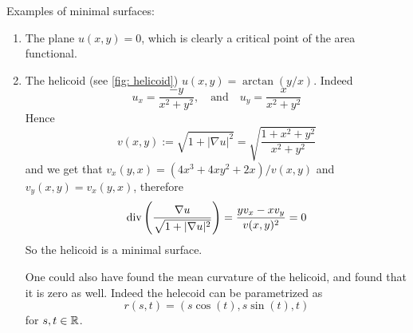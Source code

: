 \begin{example}
Examples of minimal surfaces:
\begin{enumerate}
\item The plane $u(x,y)=0$, which is clearly a critical point of the area functional.
\item The helicoid (see \cref{fig: helicoid}) $u(x,y)=\arctan(y/x)$. Indeed
\[
    u_x = \frac{-y}{x^2+y^2}, \quad \text{and} \quad u_y=\frac{x}{x^2+y^2}
\]
Hence
\[
    v(x,y):=\sqrt{1+|\nabla u|^2} = \sqrt{\frac{1+x^2+y^2}{x^2+y^2}}
\]
and we get that $v_x(y,x)=(4x^3+4xy^2+2x)/v(x,y)$ and $v_y(x,y)=v_x(y,x)$, therefore
\[
    \operatorname{div}\left(\frac{\nabla u}{\sqrt{1+|\nabla u|^2}}\right) = \frac{yv_x-xv_y}{v(x,y)^2} = 0
\]
So the helicoid is a minimal surface.

One could also have found the mean curvature of the helicoid, and found that it is zero as well. Indeed
the helecoid can be parametrized as
\[
    r(s,t) = (s\cos(t),s\sin(t),t)
\]
for $s,t \in \mathbb{R}$.


\end{enumerate}
\end{example}
